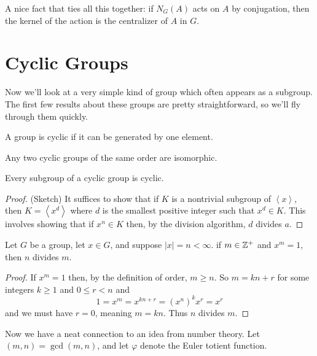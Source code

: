 \documentclass[../m171main.tex]{subfiles}
\begin{document}
A nice fact that ties all this together: if $N_G(A)$ acts on $A$ by conjugation, then the kernel of the action is the centralizer of $A$ in $G$.

\section{Cyclic Groups}
Now we'll look at a very simple kind of group which often appears as a subgroup.
The first few results about these groups are pretty straightforward, so we'll fly through them quickly.

\begin{definition}
    A group is cyclic if it can be generated by one element.
\end{definition}

\begin{theorem}[]
    Any two cyclic groups of the same order are isomorphic.
\end{theorem}

\begin{theorem}
    Every subgroup of a cyclic group is cyclic.
\end{theorem}

\begin{proof}
    (Sketch) It suffices to show that if $K$ is a nontrivial subgroup of $\left< x \right>$, then $K = \left< x^{d} \right>$ where $d$ is the smallest positive integer such that $x^{d} \in K$.
    This involves showing that if $x^{n} \in K$ then, by the division algorithm, $d$ divides $a$.
\end{proof}

\begin{theorem}[]
    Let $G$ be a group, let $x \in G$, and suppose $|x| = n < \infty$.
    if $m \in \mathbb{Z}^+$ and $x^{m} = 1$, then $n$ divides $m$.
\end{theorem}

\begin{proof}
    If $x^{m} = 1$ then, by the definition of order, $m \geq n$.
    So $m = kn + r$ for some integers $k \geq 1$ and $0 \leq r < n$ and \vspace{-6pt}
    \[ 1 = x^{m} = x^{kn + r} = \left( x^{n} \right)^{k} x^{r} = x^{r} \]
    and we must have $r = 0$, meaning $m = kn$.
    Thus $n$ divides $m$.
\end{proof}

Now we have a neat connection to an idea from number theory.
Let $(m,n) = \gcd(m,n)$, and let $\varphi$ denote the Euler totient function.
\end{document}
